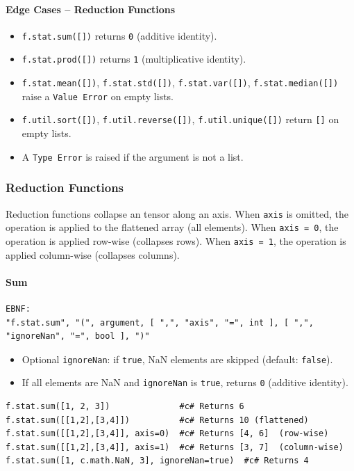 \paragraph{Edge Cases -- Reduction Functions}
\begin{itemize}
\item \texttt{f.stat.sum([])} returns \texttt{0} (additive identity).
\item \texttt{f.stat.prod([])} returns \texttt{1} (multiplicative identity).
\item \texttt{f.stat.mean([])}, \texttt{f.stat.std([])}, \texttt{f.stat.var([])}, \texttt{f.stat.median([])} raise a \texttt{Value Error} on empty lists.
\item \texttt{f.util.sort([])}, \texttt{f.util.reverse([])}, \texttt{f.util.unique([])} return \texttt{[]} on empty lists.
\item A \texttt{Type Error} is raised if the argument is not a list.
\end{itemize}

\subsubsection{Reduction Functions}
Reduction functions collapse an tensor along an axis. When \texttt{axis} is omitted, the operation is applied to the flattened array (all elements). When \texttt{axis = 0}, the operation is applied row-wise (collapses rows). When \texttt{axis = 1}, the operation is applied column-wise (collapses columns).

\paragraph{Sum}
\begin{verbatim}
EBNF:
"f.stat.sum", "(", argument, [ ",", "axis", "=", int ], [ ",", "ignoreNan", "=", bool ], ")"
\end{verbatim}
\begin{itemize}
\item Optional \texttt{ignoreNan}: if \texttt{true}, NaN elements are skipped (default: \texttt{false}).
\item If all elements are NaN and \texttt{ignoreNan} is \texttt{true}, returns \texttt{0} (additive identity).
\end{itemize}
\begin{verbatim}
f.stat.sum([1, 2, 3])              #c# Returns 6
f.stat.sum([[1,2],[3,4]])          #c# Returns 10 (flattened)
f.stat.sum([[1,2],[3,4]], axis=0)  #c# Returns [4, 6]  (row-wise)
f.stat.sum([[1,2],[3,4]], axis=1)  #c# Returns [3, 7]  (column-wise)
f.stat.sum([1, c.math.NaN, 3], ignoreNan=true)  #c# Returns 4
\end{verbatim}


